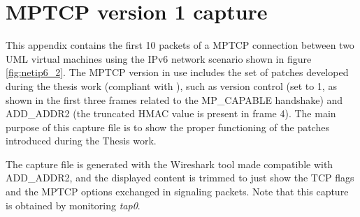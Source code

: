 \chapter{MPTCP version 1 capture}
\label{app:b}

This appendix contains the first 10 packets of a MPTCP connection between two UML virtual machines using the IPv6 network scenario shown in figure \ref{fig:netip6_2}. The MPTCP version in use includes the set of patches developed during the thesis work (compliant with ), such as version control (set to 1, as shown in the first three frames related to the MP\_CAPABLE handshake) and ADD\_ADDR2 (the truncated HMAC value is present in frame 4). The main purpose of this capture file is to show the proper functioning of the patches introduced during the Thesis work.

The capture file is generated with the Wireshark tool made compatible with ADD\_ADDR2, and the displayed content is trimmed to just show the TCP flags and the MPTCP options exchanged in signaling packets. Note that this capture is obtained by monitoring \textit{tap0}.

